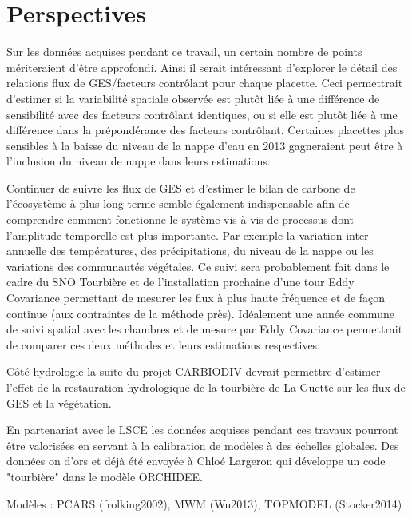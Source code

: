 \section*{Perspectives}

Sur les données acquises pendant ce travail, un certain nombre de points mériteraient d'être approfondi.
Ainsi il serait intéressant d'explorer le détail des relations flux de GES/facteurs contrôlant pour chaque placette.
Ceci permettrait d'estimer si la variabilité spatiale observée est plutôt liée à une différence de sensibilité avec des facteurs contrôlant identiques, ou si elle est plutôt liée à une différence dans la prépondérance des facteurs contrôlant.
Certaines placettes plus sensibles à la baisse du niveau de la nappe d'eau en 2013 gagneraient peut être à l'inclusion du niveau de nappe dans leurs estimations.

Continuer de suivre les flux de GES et d'estimer le bilan de carbone de l'écosystème à plus long terme semble également indispensable afin de comprendre comment fonctionne le système vis-à-vis de processus dont l'amplitude temporelle est plus importante.
Par exemple la variation inter-annuelle des températures, des précipitations, du niveau de la nappe ou les variations des communautés végétales.
Ce suivi sera probablement fait dans le cadre du SNO Tourbière et de l'installation prochaine d'une tour Eddy Covariance permettant de mesurer les flux à plus haute fréquence et de façon continue (aux contraintes de la méthode près).
Idéalement une année commune de suivi spatial avec les chambres et de mesure par Eddy Covariance permettrait de comparer ces deux méthodes et leurs estimations respectives. 

Côté hydrologie la suite du projet CARBIODIV devrait permettre d'estimer l'effet de la restauration hydrologique de la tourbière de La Guette sur les flux de GES et la végétation.

En partenariat avec le LSCE les données acquises pendant ces travaux pourront être valorisées en servant à la calibration de modèles à des échelles globales.
Des données on d'ors et déjà été envoyée à Chloé Largeron qui développe un code "tourbière" dans le modèle ORCHIDEE.

Modèles : PCARS (frolking2002), MWM (Wu2013), TOPMODEL (Stocker2014)





